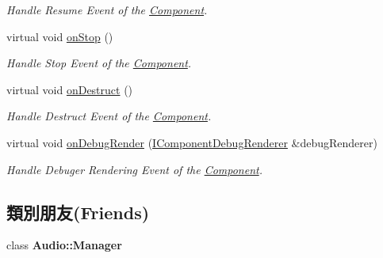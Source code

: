 \begin{DoxyCompactItemize}
\begin{DoxyCompactList}\small\item\em Handle Resume Event of the \hyperlink{class_magnum_1_1_component}{Component}. \end{DoxyCompactList}\item 
virtual void \hyperlink{class_magnum_1_1_audio_listener_a8318b6864127b23125f9a987464fb56b}{on\+Stop} ()\hypertarget{class_magnum_1_1_audio_listener_a8318b6864127b23125f9a987464fb56b}{}\label{class_magnum_1_1_audio_listener_a8318b6864127b23125f9a987464fb56b}

\begin{DoxyCompactList}\small\item\em Handle Stop Event of the \hyperlink{class_magnum_1_1_component}{Component}. \end{DoxyCompactList}\item 
virtual void \hyperlink{class_magnum_1_1_audio_listener_af655de46d81b6dd981883ebbb20e8a50}{on\+Destruct} ()\hypertarget{class_magnum_1_1_audio_listener_af655de46d81b6dd981883ebbb20e8a50}{}\label{class_magnum_1_1_audio_listener_af655de46d81b6dd981883ebbb20e8a50}

\begin{DoxyCompactList}\small\item\em Handle Destruct Event of the \hyperlink{class_magnum_1_1_component}{Component}. \end{DoxyCompactList}\item 
virtual void \hyperlink{class_magnum_1_1_audio_listener_ac8349af6fd68103d03a66b8060c68fdc}{on\+Debug\+Render} (\hyperlink{class_magnum_1_1_i_component_debug_renderer}{I\+Component\+Debug\+Renderer} \&debug\+Renderer)\hypertarget{class_magnum_1_1_audio_listener_ac8349af6fd68103d03a66b8060c68fdc}{}\label{class_magnum_1_1_audio_listener_ac8349af6fd68103d03a66b8060c68fdc}

\begin{DoxyCompactList}\small\item\em Handle Debuger Rendering Event of the \hyperlink{class_magnum_1_1_component}{Component}. \end{DoxyCompactList}\end{DoxyCompactItemize}
\subsection*{類別朋友(Friends)}
\begin{DoxyCompactItemize}
\item 
class {\bfseries Audio\+::\+Manager}\hypertarget{class_magnum_1_1_audio_listener_a3ad7b469f47b268897de410969c1c7cd}{}\label{class_magnum_1_1_audio_listener_a3ad7b469f47b268897de410969c1c7cd}

\end{DoxyCompactItemize}


